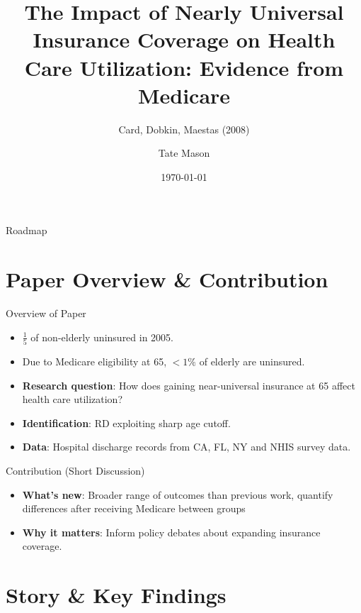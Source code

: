 \documentclass[aspectratio=169,professionalfonts]{beamer}
\title[Nearly Universal]{The Impact of Nearly Universal Insurance Coverage on Health Care Utilization: Evidence from Medicare}
\subtitle{Card, Dobkin, Maestas (2008)}
\author[Tate Mason]{Tate Mason}
\institute[UGA]{John Munro Godfrey Sr. Dept. of Economics \\ University of Georgia}
\date{\today}
\newcommand{\hl}[1]{\textbf{\textcolor{UGARed}{#1}}}
\begin{document}
\begin{frame}
  \titlepage
\end{frame}

\begin{frame}{Roadmap}
  \tableofcontents
\end{frame}

\section{Paper Overview \& Contribution}

\begin{frame}{Overview of Paper}
  \begin{itemize}
    \item $\frac{1}{5}$ of non-elderly uninsured in 2005.
    \item Due to Medicare eligibility at 65, $ < 1\%$ of elderly are uninsured.
    \item \hl{Research question}: How does gaining near-universal insurance at 65 affect health care utilization?
    \item \hl{Identification}: RD exploiting sharp age cutoff.
    \item \hl{Data}: Hospital discharge records from CA, FL, NY and NHIS survey data.
  \end{itemize}
\end{frame}

\begin{frame}{Contribution (Short Discussion)}
  \begin{itemize}
    \item \hl{What’s new}: Broader range of outcomes than previous work, quantify differences after receiving Medicare between groups 
    \item \hl{Why it matters}: Inform policy debates about expanding insurance coverage.
  \end{itemize}
\end{frame}

\section{Story \& Key Findings}
\end{document}
